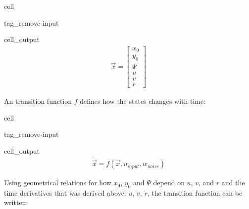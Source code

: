 \documentclass[review]{elsarticle}
\begin{document}
\begin{sphinxuseclass}{cell}
\begin{sphinxuseclass}{tag_remove-input}
\begin{sphinxuseclass}{cell_output}\begin{equation*}
\begin{split}\displaystyle \vec{x} = \left[\begin{matrix}x_{0}\\y_{0}\\\Psi\\u\\v\\r\end{matrix}\right]\end{split}
\end{equation*}
\end{sphinxuseclass}
\end{sphinxuseclass}
\end{sphinxuseclass}
\sphinxAtStartPar
An transition function \(f\) defines how the states changes with time:

\begin{sphinxuseclass}{cell}
\begin{sphinxuseclass}{tag_remove-input}
\begin{sphinxuseclass}{cell_output}\begin{equation*}
\begin{split}\displaystyle \dot{\vec{x}} = f{\left(\vec{x},u_{input},w_{noise} \right)}\end{split}
\end{equation*}
\end{sphinxuseclass}
\end{sphinxuseclass}
\end{sphinxuseclass}
\sphinxAtStartPar
Using geometrical relations for how \(x_0\), \(y_0\) and \(\Psi\) depend on \(u\), \(v\), and \(r\) and the time derivatives that was derived above: \(\dot{u}\), \(\dot{v}\), \(\dot{r}\), the transition function can be written:
\end{document}
